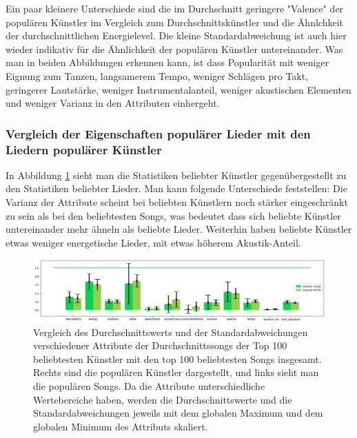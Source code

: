 \documentclass[conference]{IEEEtran}
\begin{document}
Ein paar kleinere Unterschiede sind die im Durchschnitt geringere "Valence" der populären Künstler im Vergleich zum Durchschnittskünstler und die Ähnlchkeit der durchschnittlichen Energielevel. Die kleine Standardabweichung ist auch hier wieder indikativ für die Ähnlichkeit der populären Künstler untereinander.
Was man in beiden Abbildungen erkennen kann, ist dass Popularität mit weniger Eignung zum Tanzen, langsamerem Tempo, weniger Schlägen pro Takt, geringerer Lautstärke, weniger Instrumentalanteil, weniger akustischen Elementen und weniger Varianz in den Attributen einhergeht.

\subsubsection{Vergleich der Eigenschaften populärer Lieder mit den Liedern populärer Künstler}
In Abbildung \ref{popular artists vs popular songs} sieht man die Statistiken beliebter Künstler gegenübergestellt zu den Statistiken beliebter Lieder. Man kann folgende Unterschiede feststellen: Die Varianz der Attribute scheint bei beliebten Künstlern noch stärker eingeschränkt zu sein als bei den beliebtesten Songs, was bedeutet dass sich beliebte Künstler untereinander mehr ähneln als beliebte Lieder. Weiterhin haben beliebte Künstler etwas weniger energetische Lieder, mit etwas höherem Akustik-Anteil.

\begin{figure}[t]
\centering
\includegraphics[width=\textwidth]{images/tracks_arts.png}
\caption{Vergleich des Durchschnittswerts und der Standardabweichungen verschiedener Attribute der Durchschnittssongs der Top 100 beliebtesten Künstler mit den top 100 beliebtesten Songs insgesamt. Rechts sind die populären Künstler dargestellt, und links sieht man die populären Songs. Da die Attribute unterschiedliche Wertebereiche haben, werden die Durchschnittswerte und die Standardabweichungen jeweils mit dem globalen Maximum und dem globalen Minimum des Attributs skaliert.}
\label{popular artists vs popular songs}
\end{figure}
\end{document}
